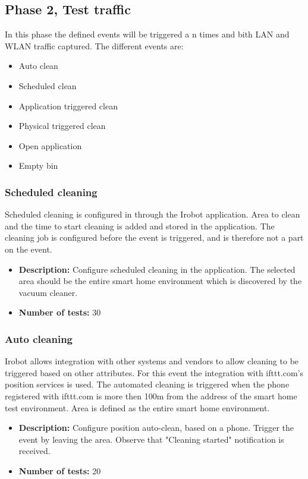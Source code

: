 \subsection{Phase 2, Test traffic}
In this phase the defined  events will be triggered a n times and bith LAN and WLAN traffic captured. The different events are: 
\begin{itemize}
    \item Auto clean
    \item Scheduled clean 
    \item Application triggered clean 
    \item Physical triggered clean
    \item Open application 
    \item Empty bin
\end{itemize}

\subsubsection{Scheduled cleaning}
Scheduled cleaning is configured in through the Irobot application. Area to clean and the time to start cleaning is added and stored in the application. The cleaning job is configured before the event is triggered, and is therefore not a part on the event. 
\begin{itemize}
    \item \textbf{Description:} Configure scheduled cleaning in the application. The selected area should be the entire smart home environment which is discovered by the vacuum cleaner.  
    \item \textbf{Number of tests:} 30
\end{itemize}

\subsubsection{Auto cleaning}
Irobot allows integration with other systems and vendors to allow cleaning to be triggered based on other attributes. For this event the integration with ifttt.com's position services is used. The automated cleaning is triggered when the phone registered with ifttt.com is more then 100m from the address of the smart home test environment. Area is defined as the entire smart home environment. 
\begin{itemize}
    \item \textbf{Description:} Configure position auto-clean, based on a phone. Trigger the event by leaving the area. Observe that "Cleaning started" notification is received.
    \item \textbf{Number of tests:} 20
\end{itemize}

